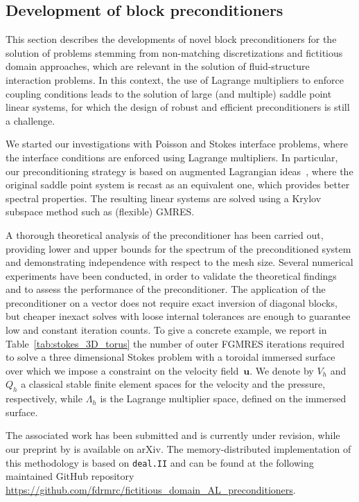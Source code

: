 \documentclass[a4paper,12pt]{article}
\begin{document}
\subsection{Development of block preconditioners}
\label{sec:preconditioning}
This section describes the developments of novel block preconditioners for the solution of problems stemming from
non-matching discretizations and fictitious domain approaches, which are relevant in the solution
of fluid-structure interaction problems. In this context, the use of Lagrange multipliers to enforce coupling conditions
leads to the solution of large (and multiple) saddle point linear systems, for which the design of robust and
efficient preconditioners is still a challenge.

We started our investigations with Poisson and Stokes interface problems, where the interface conditions are enforced
using Lagrange multipliers. In particular, our preconditioning strategy is based on augmented Lagrangian ideas~\citep{BenziAL}, where the original saddle point system is recast
as an equivalent one, which provides better spectral properties. The resulting linear systems are solved using a Krylov subspace method such as (flexible) GMRES.

A thorough theoretical analysis of the preconditioner has been carried out, providing lower and upper bounds for the spectrum of
the preconditioned system and demonstrating independence with respect to the mesh size. Several numerical experiments have been conducted,
in order to validate the theoretical findings and to assess the performance of the preconditioner. The application of the
preconditioner on a vector does not require exact inversion of diagonal blocks, but cheaper inexact solves with loose internal tolerances are enough to guarantee
low and constant iteration counts. To give a concrete example, we report in Table~\ref{tab:stokes_3D_torus} the number of
outer FGMRES iterations required to solve a three dimensional Stokes problem with a toroidal immersed surface over which we impose a constraint on the
velocity field~$\mathbf{u}$. We denote by $V_h$ and $Q_h$ a classical stable finite element spaces for the velocity and the pressure, respectively, while
$\Lambda_h$ is the Lagrange multiplier space, defined on the immersed surface.

The associated work has been submitted and is currently under revision, while our preprint by \cite{ALprec} is available on
arXiv. The memory-distributed implementation of this methodology is based on \texttt{deal.II}
and can be found at the following maintained GitHub
repository \url{https://github.com/fdrmrc/fictitious_domain_AL_preconditioners}.
\end{document}
